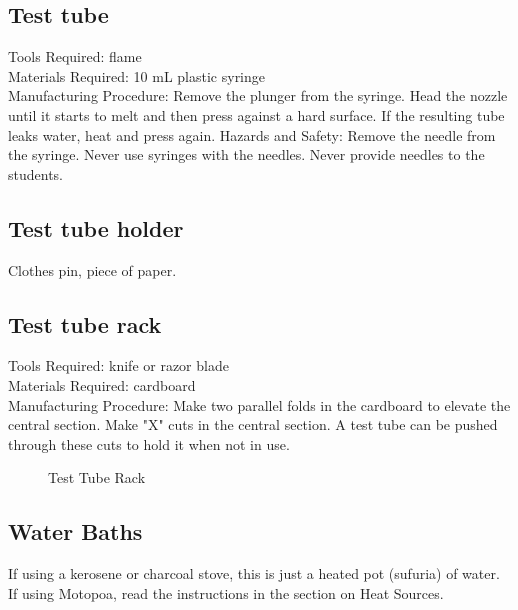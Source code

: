\subsection*{Test tube}
Tools Required: flame\\
Materials Required: 10 mL plastic syringe\\
Manufacturing Procedure: Remove the plunger from the syringe. Head the nozzle until it starts to melt and then press against a hard surface. If the resulting tube leaks water, heat and press again.
Hazards and Safety: Remove the needle from the syringe. Never use syringes with the needles. Never provide needles to the students.

\subsection*{Test tube holder}
Clothes pin, piece of paper.

\subsection*{Test tube rack}
Tools Required: knife or razor blade\\
Materials Required: cardboard\\
Manufacturing Procedure: Make two parallel folds in the cardboard to elevate the central section. Make "X" cuts in the central section. A test tube can be pushed through these cuts to hold it when not in use.

\begin{figure}[h]
\begin{center}
\def\svgwidth{150pt}

\caption{Test Tube Rack}
\end{center}
\end{figure}

\subsection*{Water Baths}
If using a kerosene or charcoal stove, this is just a heated pot (sufuria) of water. If using Motopoa, read the instructions in the section on Heat Sources.
